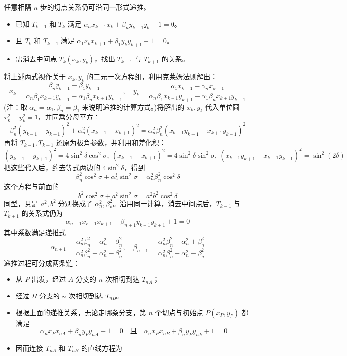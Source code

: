 \begin{solution}
任意相隔 $n$ 步的切点关系仍可沿同一形式递推。
\begin{itemize}
\item 已知 $T_{k-1}$ 和 $T_k$ 满足 $\alpha_n x_{k-1} x_k + \beta_n y_{k-1} y_k + 1 = 0$。
\item 且 $T_k$ 和 $T_{k+1}$ 满足 $\alpha_1 x_k x_{k+1} + \beta_1 y_k y_{k+1} + 1 = 0$。
\item 需消去中间点 $T_k(x_k, y_k)$，找出 $T_{k-1}$ 与 $T_{k+1}$ 的关系。
\end{itemize}
将上述两式视作关于 $x_k, y_k$ 的二元一次方程组，利用克莱姆法则解出：
$$x_k = \frac{\beta_n y_{k-1} - \beta_1 y_{k+1}}{\alpha_n \beta_1 x_{k-1} y_{k+1} - \alpha_1 \beta_n x_{k+1} y_{k-1}}, \quad y_k = \frac{\alpha_1 x_{k+1} - \alpha_n x_{k-1}}{\alpha_n \beta_1 x_{k-1} y_{k+1} - \alpha_1 \beta_n x_{k+1} y_{k-1}}$$
(注：取 $\alpha_n = \alpha_1, \beta_n = \beta_1$ 来说明递推的计算方式。)将解出的 $x_k, y_k$ 代入单位圆 $x_k^2 + y_k^2 = 1$，并同乘分母平方：
$$\beta_n^2 (y_{k-1} - y_{k+1})^2 + \alpha_n^2 (x_{k-1} - x_{k+1})^2 = \alpha_n^2 \beta_n^2 (x_{k-1} y_{k+1} - x_{k+1} y_{k-1})^2$$
再将 $T_{k-1}, T_{k+1}$ 还原为极角参数，并利用和差化积：
\[(y_{k-1} - y_{k+1})^2 = 4 \sin^2\delta \cos^2\sigma,~(x_{k-1} - x_{k+1})^2 = 4 \sin^2\delta \sin^2\sigma,~(x_{k-1} y_{k+1} - x_{k+1} y_{k-1})^2 = \sin^2(2\delta) \]
把这些代入后，约去等式两边的 $4 \sin^2\delta$，得到
$${\beta_n^2 \cos^2\sigma + \alpha_n^2 \sin^2\sigma = \alpha_n^2 \beta_n^2 \cos^2\delta}$$
这个方程与前面的
\[b^2 \cos^2\sigma + a^2 \sin^2\sigma = a^2 b^2 \cos^2\delta\]
同型，只是 $a^2, b^2$ 分别换成了 $\alpha_n^2, \beta_n^2$。沿用同一计算，消去中间点后，$T_{k-1}$ 与 $T_{k+1}$ 的关系式仍为
$${\alpha_{n+1} x_{k-1} x_{k+1} + \beta_{n+1} y_{k-1} y_{k+1} + 1 = 0}$$
其中系数满足递推式
$${\alpha_{n+1} = \frac{\alpha_n^2 \beta_n^2 + \alpha_n^2 - \beta_n^2}{\alpha_n^2 \beta_n^2 - \alpha_n^2 - \beta_n^2}, \quad \beta_{n+1} = \frac{\alpha_n^2 \beta_n^2 - \alpha_n^2 + \beta_n^2}{\alpha_n^2 \beta_n^2 - \alpha_n^2 - \beta_n^2}}$$
递推过程可分成两条链：
\begin{itemize}
\item 从 $P$ 出发，经过 $A$ 分支的 $n$ 次相切到达 $T_{nA}$；
\item 经过 $B$ 分支的 $n$ 次相切到达 $T_{nB}$。
\item 根据上面的递推关系，无论走哪条分支，第 $n$ 个切点与初始点 $P(x_P, y_P)$ 都满足
$$\alpha_n x_P x_{nA} + \beta_n y_P y_{nA} + 1 = 0 \quad \text{且} \quad \alpha_n x_P x_{nB} + \beta_n y_P y_{nB} + 1 = 0$$
\item 因而连接 $T_{nA}$ 和 $T_{nB}$ 的直线方程为

\end{itemize}
\end{solution}
